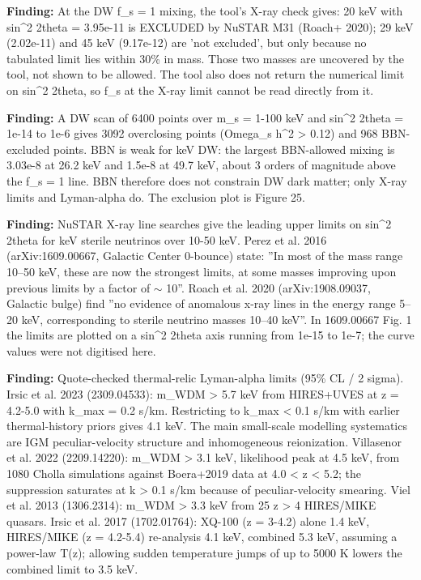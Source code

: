 \documentclass[11pt,a4paper]{article}
\begin{document}
\textbf{Finding:} At the DW f\_s = 1 mixing, the tool's X-ray check gives: 20 keV with sin\textasciicircum{}2 2theta = 3.95e-11 is EXCLUDED by NuSTAR M31 (Roach+ 2020); 29 keV (2.02e-11) and 45 keV (9.17e-12) are 'not excluded', but only because no tabulated limit lies within 30\% in mass. Those two masses are uncovered by the tool, not shown to be allowed. The tool also does not return the numerical limit on sin\textasciicircum{}2 2theta, so f\_s at the X-ray limit cannot be read directly from it.

\textbf{Finding:} A DW scan of 6400 points over m\_s = 1-100 keV and sin\textasciicircum{}2 2theta = 1e-14 to 1e-6 gives 3092 overclosing points (Omega\_s h\textasciicircum{}2 \textgreater{} 0.12) and 968 BBN-excluded points. BBN is weak for keV DW: the largest BBN-allowed mixing is 3.03e-8 at 26.2 keV and 1.5e-8 at 49.7 keV, about 3 orders of magnitude above the f\_s = 1 line. BBN therefore does not constrain DW dark matter; only X-ray limits and Lyman-alpha do. The exclusion plot is Figure 25.

\textbf{Finding:} NuSTAR X-ray line searches give the leading upper limits on sin\textasciicircum{}2 2theta for keV sterile neutrinos over 10-50 keV. Perez et al. 2016 (arXiv:1609.00667, Galactic Center 0-bounce) state: ''In most of the mass range 10--50 keV, these are now the strongest limits, at some masses improving upon previous limits by a factor of $\sim$ 10''. Roach et al. 2020 (arXiv:1908.09037, Galactic bulge) find ''no evidence of anomalous x-ray lines in the energy range 5--20 keV, corresponding to sterile neutrino masses 10--40 keV''. In 1609.00667 Fig. 1 the limits are plotted on a sin\textasciicircum{}2 2theta axis running from 1e-15 to 1e-7; the curve values were not digitised here.

\textbf{Finding:} Quote-checked thermal-relic Lyman-alpha limits (95\% CL / 2 sigma). Irsic et al. 2023 (2309.04533): m\_WDM \textgreater{} 5.7 keV from HIRES+UVES at z = 4.2-5.0 with k\_max = 0.2 s/km. Restricting to k\_max \textless{} 0.1 s/km with earlier thermal-history priors gives 4.1 keV. The main small-scale modelling systematics are IGM peculiar-velocity structure and inhomogeneous reionization. Villasenor et al. 2022 (2209.14220): m\_WDM \textgreater{} 3.1 keV, likelihood peak at 4.5 keV, from 1080 Cholla simulations against Boera+2019 data at 4.0 \textless{} z \textless{} 5.2; the suppression saturates at k \textgreater{} 0.1 s/km because of peculiar-velocity smearing. Viel et al. 2013 (1306.2314): m\_WDM \textgreater{} 3.3 keV from 25 z \textgreater{} 4 HIRES/MIKE quasars. Irsic et al. 2017 (1702.01764): XQ-100 (z = 3-4.2) alone 1.4 keV, HIRES/MIKE (z = 4.2-5.4) re-analysis 4.1 keV, combined 5.3 keV, assuming a power-law T(z); allowing sudden temperature jumps of up to 5000 K lowers the combined limit to 3.5 keV.
\end{document}
